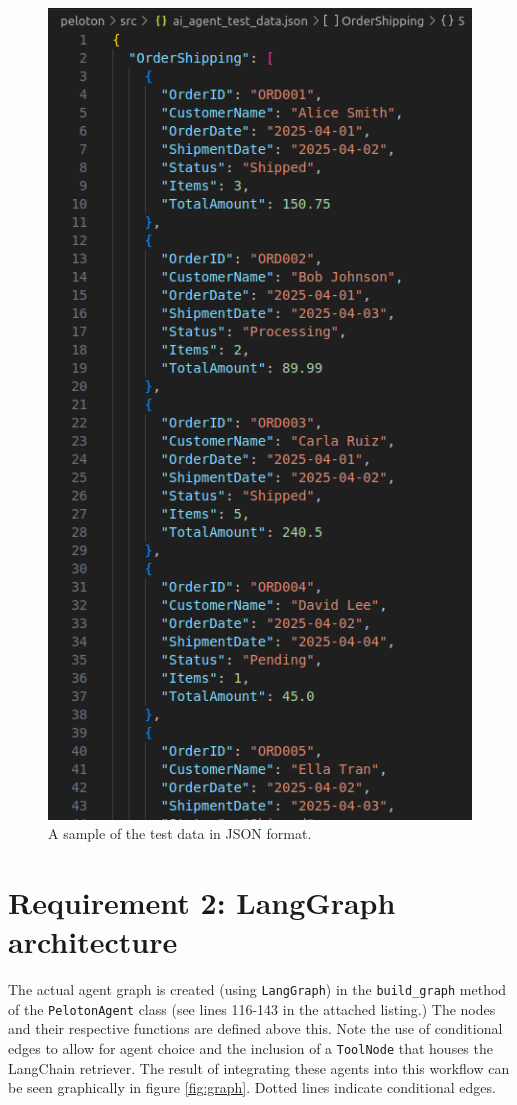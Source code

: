 \documentclass[11pt,letterpaper]{article}
\begin{document}
\begin{figure}[h]
    \centering
      \includegraphics{test_data_json.png}
      \caption{A sample of the test data in JSON format.}
    \label{fig:test_data}
\end{figure}

\section*{Requirement 2: LangGraph architecture}
\tab The actual agent graph is created (using \texttt{LangGraph}) in the \texttt{build\_graph} method of the \texttt{PelotonAgent} class (see lines 116-143 in the attached listing.) The nodes and their respective functions are defined above this. Note the use of conditional edges to allow for agent choice and the inclusion of a \texttt{ToolNode} that houses the LangChain retriever. The result of integrating these agents into this workflow can be seen graphically in figure \ref{fig:graph}. Dotted lines indicate conditional edges.
\end{document}

